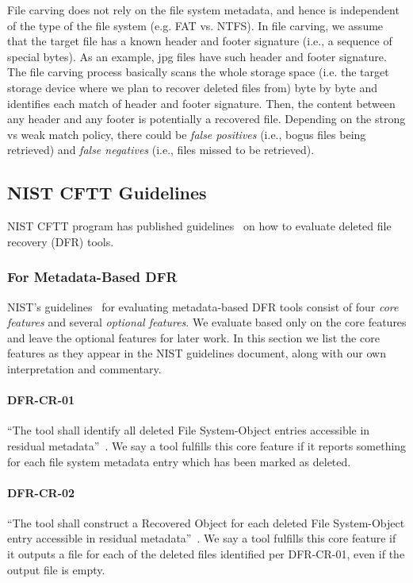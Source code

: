 File carving does not rely on the file system metadata, and hence is independent of the type of the 
file system (e.g. FAT vs. NTFS). In file carving, we assume that the target file has 
a known header and footer signature (i.e., a sequence of special bytes). As an example, 
jpg files have such header and footer signature. The file carving process basically
scans the whole storage space (i.e. the target storage device where we plan to recover deleted files from) 
byte by byte and identifies each match of header and footer signature. 
Then, the content between any header and any footer is potentially a recovered file. 
Depending on the strong vs weak match policy, there could be \emph{false positives} 
(i.e., bogus files being retrieved) 
and \emph{false negatives} (i.e., files missed to be retrieved). 

\subsection{NIST CFTT Guidelines}
NIST CFTT program has published guidelines~\cite{meta:dfr:standards,carving_standards} on how to evaluate deleted file recovery (DFR) tools.

\subsubsection{For Metadata-Based DFR}
NIST's guidelines~\cite{meta:dfr:standards} for evaluating metadata-based DFR tools consist of four \emph{core features} and several \emph{optional features}. We evaluate based only on the core features and leave the optional features for later work.
In this section we list the core features as they appear in the NIST guidelines document, along with our own interpretation and commentary.

 \paragraph{DFR-CR-01} ``The tool shall identify all deleted File System-Object entries accessible in residual metadata''~\cite{meta:dfr:standards}.
 We say a tool fulfills this core feature if it reports something for each file system metadata entry which has been marked as deleted.
 
 \paragraph{DFR-CR-02} ``The tool shall construct a Recovered Object for each deleted File System-Object entry accessible in residual metadata''~\cite{meta:dfr:standards}.
 We say a tool fulfills this core feature if it outputs a file for each of the deleted files identified per DFR-CR-01, even if the output file is empty.

